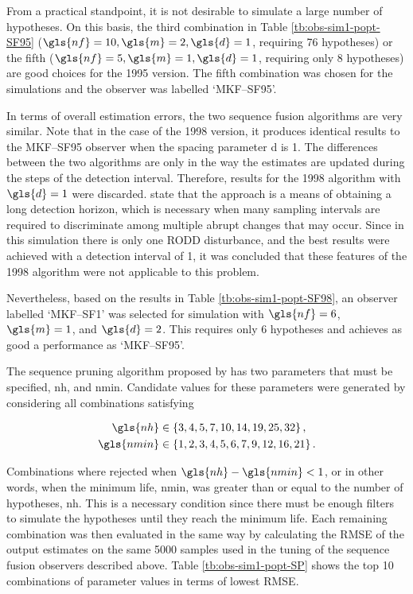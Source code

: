 From a practical standpoint, it is not desirable to simulate a large number of hypotheses. On this basis, the third combination in Table \ref{tb:obs-sim1-popt-SF95} ($\gls{nf}=10,\gls{m}=2,\gls{d}=1$, requiring 76 hypotheses) or the fifth ($\gls{nf}=5,\gls{m}=1,\gls{d}=1$, requiring only 8 hypotheses) are good choices for the 1995 version. The fifth combination was chosen for the simulations and the observer was labelled `MKF--SF95'. 

In terms of overall estimation errors, the two sequence fusion algorithms are very similar. Note that in the case of the 1998 version, it produces identical results to the MKF--SF95 observer when the spacing parameter \gls{d} is 1. The differences between the two algorithms are only in the way the estimates are updated during the steps of the detection interval. Therefore, results for the 1998 algorithm with $\gls{d}=1$ were discarded. \cite{robertson_method_1998} state that the approach is a means of obtaining a long detection horizon, which is necessary when many sampling intervals are required to discriminate among multiple abrupt changes that may occur. Since in this simulation there is only one \gls{RODD} disturbance, and the best results were achieved with a detection interval of 1, it was concluded that these features of the 1998 algorithm were not applicable to this problem.

Nevertheless, based on the results in Table \ref{tb:obs-sim1-popt-SF98}, an observer labelled `MKF--SF1' was selected for simulation with $\gls{nf}=6$, $\gls{m}=1$, and $\gls{d}=2$. This requires only 6 hypotheses and achieves as good a performance as `MKF--SF95'.

The sequence pruning algorithm proposed by \cite{eriksson_classification_1996} has two parameters that must be specified, \gls{nh}, and \gls{nmin}. Candidate values for these parameters were generated by considering all combinations satisfying

\begin{equation} \label{eq:sim-sys-siso-MKF-SP-param-values}
	\begin{aligned}
		\gls{nh} &\in \left\{3, 4, 5, 7, 10, 14, 19, 25, 32\right\},  \\
		\gls{nmin} &\in \left\{1, 2, 3, 4, 5, 6, 7, 9, 12, 16, 21\right\}.
	\end{aligned}
\end{equation}

Combinations where rejected when $\gls{nh} - \gls{nmin} < 1$, or in other words, when the minimum life, \gls{nmin}, was greater than or equal to the number of hypotheses, \gls{nh}. This is a necessary condition since there must be enough filters to simulate the hypotheses until they reach the minimum life. Each remaining combination was then evaluated in the same way by calculating the \gls{RMSE} of the output estimates on the same 5000 samples used in the tuning of the sequence fusion observers described above. Table \ref{tb:obs-sim1-popt-SP} shows the top 10 combinations of parameter values in terms of lowest \gls{RMSE}.


